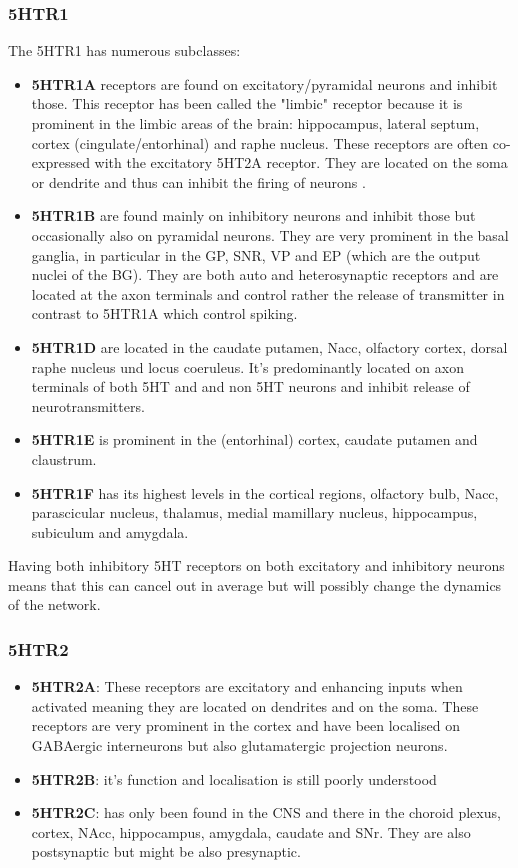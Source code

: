 \documentclass[12pt,a4paper]{article}
\begin{document}
\subsubsection{5HTR1}
The 5HTR1 has numerous subclasses:
\begin{itemize}
  \item \textbf{5HTR1A} receptors are found on excitatory/pyramidal neurons and
    inhibit those. This receptor has been called the "limbic" receptor
    because it is prominent in the limbic areas of the brain:
    hippocampus, lateral septum, cortex (cingulate/entorhinal) and
    raphe nucleus. These receptors are often co-expressed with the
    excitatory 5HT2A receptor. They are located on the soma or
    dendrite and thus can inhibit the firing of neurons
    \citep{Riad2000}.
  \item \textbf{5HTR1B} are found mainly on inhibitory neurons and inhibit
    those but occasionally also on pyramidal neurons. They are very
    prominent in the basal ganglia, in particular in the GP, SNR, VP
    and EP (which are the output nuclei of the BG). They are both auto
    and heterosynaptic receptors and are located at the axon terminals
    \citep{Riad2000} and control rather the release of transmitter in
    contrast to 5HTR1A which control spiking.
  \item \textbf{5HTR1D} are located in the caudate putamen, Nacc, olfactory
    cortex, dorsal raphe nucleus und locus coeruleus. It's
    predominantly located on axon terminals of both 5HT and and non
    5HT neurons and inhibit release of neurotransmitters.
  \item \textbf{5HTR1E} is prominent in the (entorhinal) cortex, caudate
    putamen and claustrum.
  \item \textbf{5HTR1F} has its highest levels in the cortical regions,
    olfactory bulb, Nacc, parascicular nucleus, thalamus, medial
    mamillary nucleus, hippocampus, subiculum and amygdala.
\end{itemize}

Having both inhibitory 5HT receptors on both excitatory and inhibitory
neurons means that this can cancel out in average but will possibly
change the dynamics of the network.

\subsubsection{5HTR2}
\begin{itemize}
  \item \textbf{5HTR2A}: These receptors are excitatory and enhancing
    inputs when activated meaning they are located on dendrites and on
    the soma. These receptors are very prominent in the cortex and
    have been localised on GABAergic interneurons but also
    glutamatergic projection neurons.
  \item \textbf{5HTR2B}: it's function and localisation is still
    poorly understood
  \item \textbf{5HTR2C}: has only been found in the CNS and there in
    the choroid plexus, cortex, NAcc, hippocampus, amygdala, caudate
    and SNr. They are also postsynaptic but might be also presynaptic.
\end{itemize}
\end{document}
